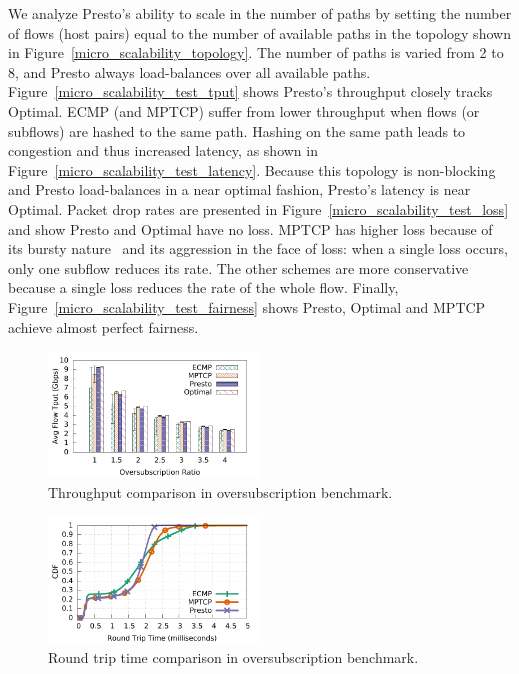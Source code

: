 We analyze Presto's ability to scale in the number of paths by
setting the number of flows (host pairs) equal to the number of available paths in the topology shown in 
Figure~\ref{micro_scalability_topology}. The number of paths is varied from 2 to 8, and 
Presto always load-balances over all available paths.
Figure~\ref{micro_scalability_test_tput} shows Presto's throughput closely tracks Optimal. 
ECMP (and MPTCP) suffer from lower throughput when flows (or subflows) are
hashed to the same path. Hashing on the same path leads to congestion and thus increased latency, as shown in Figure~\ref{micro_scalability_test_latency}.
Because this topology is non-blocking and Presto load-balances in a near optimal fashion, Presto's latency
is near Optimal. Packet drop rates are presented in Figure~\ref{micro_scalability_test_loss} and show
Presto and Optimal have no loss. MPTCP has higher loss because of its bursty nature~\cite{conga}
and its aggression in the face of loss: when a single loss occurs, only
one subflow reduces its rate. The other schemes are more conservative because a single loss reduces the rate of the whole flow.
Finally, Figure~\ref{micro_scalability_test_fairness} shows Presto, Optimal and MPTCP
achieve almost perfect fairness.


\begin{figure}[!t]
        \centering
  \includegraphics[width=0.5\textwidth]{presto/figures/congestion_test/congestion_compare_tput_witherrbar.pdf}
        \caption{Throughput comparison in oversubscription benchmark.}
        \label{micro_congestion_test_tput}
\end{figure}


\begin{figure}[!t]
        \centering
  \includegraphics[width=0.5\textwidth]{presto/figures/congestion_test/congestion_compare_latency.pdf}
        \caption{Round trip time comparison in oversubscription benchmark.
		}
        \label{micro_congestion_test_latency}
\end{figure}



